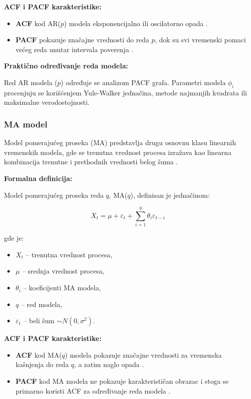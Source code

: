 \documentclass[12pt]{article}
\begin{document}
\noindent\textbf{ACF i PACF karakteristike:}

\begin{itemize}
    \item \textbf{ACF} kod AR($p$) modela eksponencijalno ili oscilatorno opada \cite{box1970}.
    \item \textbf{PACF} pokazuje značajne vrednosti do reda $p$, dok su svi vremenski pomaci većeg reda unutar intervala poverenja \cite{brockwell2002, hamilton1994}.
\end{itemize}

\noindent\textbf{Praktično određivanje reda modela:}

Red AR modela ($p$) određuje se analizom PACF grafa. Parametri modela $\phi_i$ procenjuju se korišćenjem Yule-Walker jednačina, metode najmanjih kvadrata ili maksimalne verodostojnosti.

\vspace{0.5cm}

\subsubsection{MA model}

Model pomerajućeg proseka (MA) predstavlja drugu osnovnu klasu linearnih vremenskih modela, gde se trenutna vrednost procesa izražava kao linearna kombinacija trenutne i prethodnih vrednosti belog šuma \cite{box1970, brockwell2002}.

\noindent\textbf{Formalna definicija:}

Model pomerajućeg proseka reda $q$, MA($q$), definisan je jednačinom:

\begin{equation}
X_t = \mu + \varepsilon_t + \sum_{i=1}^{q} \theta_i \varepsilon_{t-i}
\end{equation}

gde je:
\begin{itemize}
    \item $X_t$ -- trenutna vrednost procesa,
    \item $\mu$ -- srednja vrednost procesa,
    \item $\theta_i$ -- koeficijenti MA modela,
    \item $q$ -- red modela,
    \item $\varepsilon_t$ -- beli šum $\sim N(0, \sigma^2)$.
\end{itemize}

\noindent\textbf{ACF i PACF karakteristike:}

\begin{itemize}
    \item \textbf{ACF} kod MA($q$) modela pokazuje značajne vrednosti za vremenska kašnjenja do reda $q$, a zatim naglo opada \cite{box1970}.
    \item \textbf{PACF} kod MA modela ne pokazuje karakterističan obrazac i stoga se primarno koristi ACF za određivanje reda modela \cite{brockwell2002}.
\end{itemize}
\end{document}
